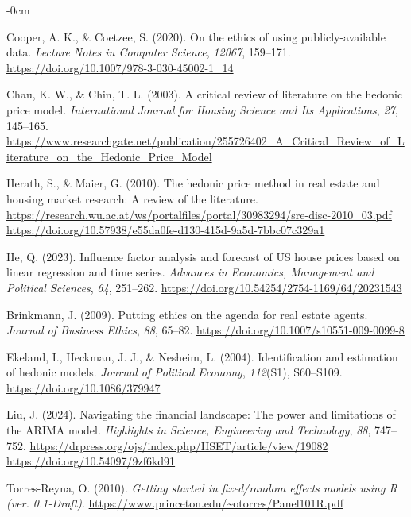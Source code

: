 \documentclass[journal,article,submit,pdftex,moreauthors]{Definitions/mdpi}
\begin{document}
\begin{adjustwidth}{-\extralength}{0cm}
\begin{thebibliography}{99}
Cooper, A. K., \& Coetzee, S. (2020). On the ethics of using publicly-available data. \textit{Lecture Notes in Computer Science}, \textit{12067}, 159--171. \url{https://doi.org/10.1007/978-3-030-45002-1_14}

Chau, K. W., \& Chin, T. L. (2003). A critical review of literature on the hedonic price model. \textit{International Journal for Housing Science and Its Applications}, \textit{27}, 145--165. \url{https://www.researchgate.net/publication/255726402_A_Critical_Review_of_Literature_on_the_Hedonic_Price_Model}

Herath, S., \& Maier, G. (2010). The hedonic price method in real estate and housing market research: A review of the literature. \url{https://research.wu.ac.at/ws/portalfiles/portal/30983294/sre-disc-2010_03.pdf} \url{https://doi.org/10.57938/e55da0fe-d130-415d-9a5d-7bbc07c329a1}

He, Q. (2023). Influence factor analysis and forecast of US house prices based on linear regression and time series. \textit{Advances in Economics, Management and Political Sciences}, \textit{64}, 251--262. \url{https://doi.org/10.54254/2754-1169/64/20231543}

Brinkmann, J. (2009). Putting ethics on the agenda for real estate agents. \textit{Journal of Business Ethics}, \textit{88}, 65--82. \url{https://doi.org/10.1007/s10551-009-0099-8}

Ekeland, I., Heckman, J. J., \& Nesheim, L. (2004). Identification and estimation of hedonic models. \textit{Journal of Political Economy}, \textit{112}(S1), S60--S109. \url{https://doi.org/10.1086/379947}

Liu, J. (2024). Navigating the financial landscape: The power and limitations of the ARIMA model. \textit{Highlights in Science, Engineering and Technology}, \textit{88}, 747--752. \url{https://drpress.org/ojs/index.php/HSET/article/view/19082} \url{https://doi.org/10.54097/9zf6kd91}

Torres-Reyna, O. (2010). \textit{Getting started in fixed/random effects models using R (ver. 0.1-Draft)}. \url{https://www.princeton.edu/~otorres/Panel101R.pdf}


\end{thebibliography}
\end{adjustwidth}
\end{document}
